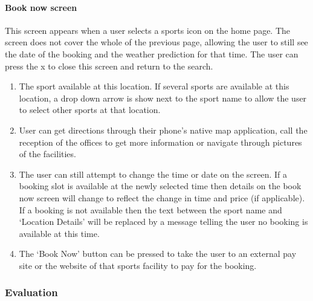 \paragraph{Book now screen}
This screen appears when a user selects a sports icon on the home page. The
screen does not cover the whole of the previous page, allowing the user to
still see the date of the booking and the weather prediction for that time. The
user can press the x to close this screen and return to the search.

\begin{enumerate}
	\item The sport available at this location. If several sports are available
		at this location, a drop down arrow is show next to the sport name to
		allow the user to select other sports at that location.
	\item User can get directions through their phone's native map application,
		call the reception of the offices to get more information or navigate
		through pictures of the facilities.
	\item The user can still attempt to change the time or date on the screen.
		If a booking slot is available at the newly selected time then details
		on the book now screen will change to reflect the change in time and
		price (if applicable). If a booking is not available then the text
		between the sport name and `Location Details' will be replaced by a
		message telling the user no booking is available at this time.
	\item The `Book Now' button can be pressed to take the user to an external
		pay site or the website of that sports facility to pay for the booking.
\end{enumerate}

\bigskip
\bigskip
\bigskip
\bigskip
\fullwidth%
\subsubsection{Evaluation}


